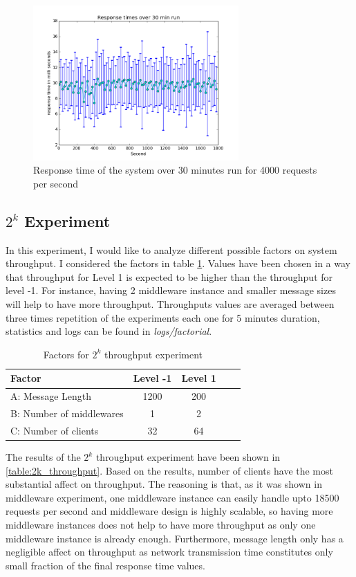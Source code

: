 \documentclass[11pt]{article}
\begin{document}
\begin{figure}[H]
  \includegraphics[width=0.7\textwidth,page=1]{figures/stability_response_time_2}
  \centering
  \caption{Response time of the system over 30 minutes run for 4000 requests per second}
  \label{fig:stability-2-response-time}
\end{figure}


\subsection{$2^k$ Experiment}\label{sec:k-experiment}
In this experiment, I would like to analyze different possible factors on 
system throughput. I considered the factors in table \ref{table:factor_throughput_2k}.
Values have been chosen in a way that throughput for Level 1 is expected to be higher than the throughput for level -1.
For instance, having 2 middleware instance and smaller message sizes will help to 
have more throughput. Throughputs values are averaged between three times repetition of the 
experiments each one for 5 minutes duration, statistics and logs can be found in \emph{logs/factorial}.

\begin{table}[ht]
\centering
\begin{tabular}{l*{3}{c}r}
Factor                   & Level -1 & Level 1  \\
\hline
A: Message Length           & 1200 & 200   \\
B: Number of middlewares    & 1    & 2  \\
C: Number of clients        & 32 & 64  \\
\end{tabular}
\label{table:factor_throughput_2k}
\caption{Factors for $2^k$ throughput experiment}
\end{table}

The results of the $2^k$ throughput experiment have been shown in 
\ref{table:2k_throughput}. Based on the results, number of clients have the 
most substantial affect on throughput. The reasoning is that, as it was 
shown in middleware experiment, one middleware instance can easily handle upto 18500 requests per second
and middleware design is highly scalable, so having more middleware instances 
does not help to have more throughput as only one middleware instance is already enough.
Furthermore, message length only has a negligible affect on throughput as 
network transmission time constitutes only small fraction of the final response time
values.
\end{document}
